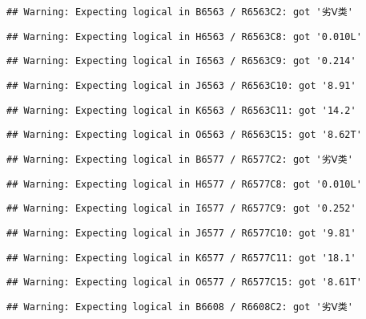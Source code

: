 \documentclass[
]{article}
\begin{document}
\begin{verbatim}
## Warning: Expecting logical in B6563 / R6563C2: got '劣Ⅴ类'
\end{verbatim}

\begin{verbatim}
## Warning: Expecting logical in H6563 / R6563C8: got '0.010L'
\end{verbatim}

\begin{verbatim}
## Warning: Expecting logical in I6563 / R6563C9: got '0.214'
\end{verbatim}

\begin{verbatim}
## Warning: Expecting logical in J6563 / R6563C10: got '8.91'
\end{verbatim}

\begin{verbatim}
## Warning: Expecting logical in K6563 / R6563C11: got '14.2'
\end{verbatim}

\begin{verbatim}
## Warning: Expecting logical in O6563 / R6563C15: got '8.62T'
\end{verbatim}

\begin{verbatim}
## Warning: Expecting logical in B6577 / R6577C2: got '劣Ⅴ类'
\end{verbatim}

\begin{verbatim}
## Warning: Expecting logical in H6577 / R6577C8: got '0.010L'
\end{verbatim}

\begin{verbatim}
## Warning: Expecting logical in I6577 / R6577C9: got '0.252'
\end{verbatim}

\begin{verbatim}
## Warning: Expecting logical in J6577 / R6577C10: got '9.81'
\end{verbatim}

\begin{verbatim}
## Warning: Expecting logical in K6577 / R6577C11: got '18.1'
\end{verbatim}

\begin{verbatim}
## Warning: Expecting logical in O6577 / R6577C15: got '8.61T'
\end{verbatim}

\begin{verbatim}
## Warning: Expecting logical in B6608 / R6608C2: got '劣Ⅴ类'
\end{verbatim}
\end{document}
